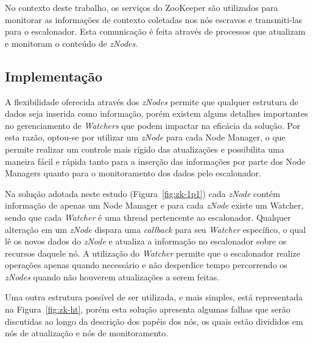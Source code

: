 No contexto deste trabalho, os serviços do ZooKeeper são utilizados para monitorar as informações de contexto coletadas nos nós escravos e transmiti-las para o escalonador. Esta comunicação é feita através de processos que atualizam e monitoram o conteúdo de \textit{zNodes}.

\subsection{Implementação}
A flexibilidade oferecida através dos \textit{zNodes} permite que qualquer estrutura de dados seja inserida como informação, porém existem alguns detalhes importantes no gerenciamento de \textit{Watchers} que podem impactar na eficácia da solução. Por esta razão, optou-se por utilizar um \textit{zNode} para cada Node Manager, o que permite realizar um controle mais rígido das atualizações e possibilita uma maneira fácil e rápida tanto para a inserção das informações por parte dos Node Managers quanto para o monitoramento dos dados pelo escalonador.

Na solução adotada neste estudo (Figura~\ref{fig:zk-1p1}) cada \textit{zNode} contém informação de apenas um Node Manager e para cada \textit{zNode} existe um Watcher, sendo que cada \textit{Watcher} é uma thread pertencente ao escalonador. Qualquer alteração em um \textit{zNode} dispara uma \textit{callback} para seu \textit{Watcher} específico, o qual lê os novos dados do \textit{zNode} e atualiza a informação no escalonador sobre os recursos daquele nó. A utilização do \textit{Watcher} permite que o escalonador realize operações apenas quando necessário e não desperdice tempo percorrendo os \textit{zNodes} quando não houverem atualizações a serem feitas.

Uma outra estrutura possível de ser utilizada, e mais simples, está representada na Figura~\ref{fig:zk-ht}, porém esta solução apresenta algumas falhas que serão discutidas ao longo da descrição dos papéis dos nós, os quais estão divididos em nós de atualização e nós de monitoramento.

%




